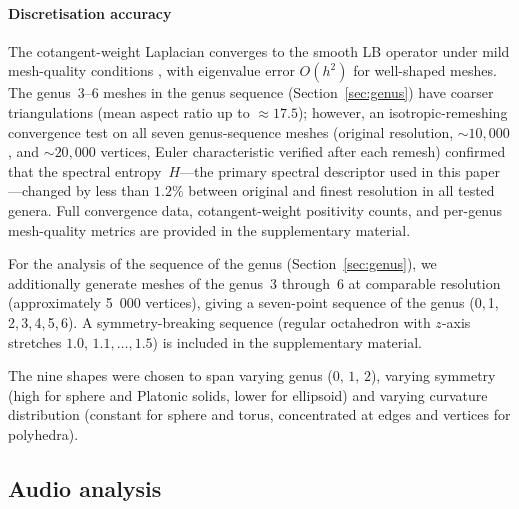 \documentclass[]{interact}
\theoremstyle{plain}
\theoremstyle{definition}
\theoremstyle{remark}
\begin{document}
\paragraph{Discretisation accuracy}
The cotangent-weight Laplacian converges to the smooth LB operator under mild mesh-quality conditions \citep{wardetzky2007convergence}, with eigenvalue error $O(h^2)$ for well-shaped meshes. The genus~3--6 meshes in the genus sequence (Section~\ref{sec:genus}) have coarser triangulations (mean aspect ratio up to ${\approx}17.5$); however, an isotropic-remeshing convergence test on all seven genus-sequence meshes (original resolution, ${\sim}10{,}000$, and ${\sim}20{,}000$ vertices, Euler characteristic verified after each remesh) confirmed that the spectral entropy~$H$---the primary spectral descriptor used in this paper---changed by less than $1.2\%$ between original and finest resolution in all tested genera. Full convergence data, cotangent-weight positivity counts, and per-genus mesh-quality metrics are provided in the supplementary material.

For the analysis of the sequence of the genus (Section~\ref{sec:genus}), we additionally generate meshes of the genus~3 through~6 at comparable resolution (approximately 5 \,000 vertices), giving a seven-point sequence of the genus (0,\,1,\,2,\,3,\,4,\,5,\,6). A symmetry-breaking sequence (regular octahedron with $z$-axis stretches $1.0,\,1.1,\ldots,1.5$) is included in the supplementary material.

The nine shapes were chosen to span varying genus ($0,\,1,\,2$), varying symmetry (high for sphere and Platonic solids, lower for ellipsoid) and varying curvature distribution (constant for sphere and torus, concentrated at edges and vertices for polyhedra).

\subsection{Audio analysis}
\end{document}
